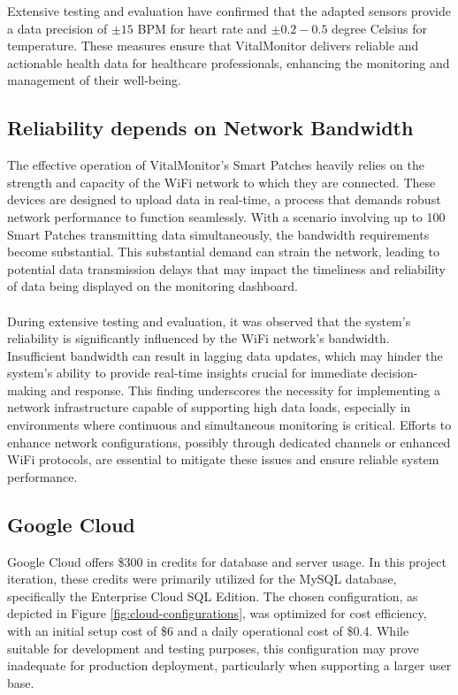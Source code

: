 \noindent Extensive testing and evaluation have confirmed that the adapted sensors provide a data precision of \(\pm 15\) BPM for heart rate and \(\pm 0.2-0.5\) degree Celsius for temperature. These measures ensure that VitalMonitor delivers reliable and actionable health data for healthcare professionals, enhancing the monitoring and management of their well-being.

\subsection{Reliability depends on Network Bandwidth}
The effective operation of VitalMonitor’s Smart Patches heavily relies on the strength and capacity of the WiFi network to which they are connected. These devices are designed to upload data in real-time, a process that demands robust network performance to function seamlessly. With a scenario involving up to 100 Smart Patches transmitting data simultaneously, the bandwidth requirements become substantial. This substantial demand can strain the network, leading to potential data transmission delays that may impact the timeliness and reliability of data being displayed on the monitoring dashboard. \\ \\
During extensive testing and evaluation, it was observed that the system's reliability is significantly influenced by the WiFi network's bandwidth. Insufficient bandwidth can result in lagging data updates, which may hinder the system’s ability to provide real-time insights crucial for immediate decision-making and response. This finding underscores the necessity for implementing a network infrastructure capable of supporting high data loads, especially in environments where continuous and simultaneous monitoring is critical. Efforts to enhance network configurations, possibly through dedicated channels or enhanced WiFi protocols, are essential to mitigate these issues and ensure reliable system performance.

\subsection{Google Cloud}
Google Cloud offers \$300 in credits for database and server usage. In this project iteration, these credits were primarily utilized for the MySQL database, specifically the Enterprise Cloud SQL Edition. The chosen configuration, as depicted in Figure \ref{fig:cloud-configurations}, was optimized for cost efficiency, with an initial setup cost of \$6 and a daily operational cost of \$0.4. While suitable for development and testing purposes, this configuration may prove inadequate for production deployment, particularly when supporting a larger user base. \\

